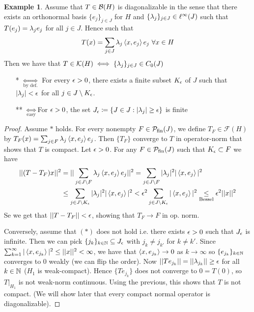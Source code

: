\documentclass[10pt,english,a4paper]{article}
\theoremstyle{definition}
\newtheorem*{example}{Example}
\def\Psfin{\mathcal{P}_{\textnormal{fin}}}
\def\Ff{\mathcal{F}}
\def\Kf{\mathcal{K}}
\begin{document}
\begin{example}
    Assume that $T \in \mathcal{B}(H)$ is diagonalizable in the sense that there exists 
an orthonormal basis $\{e_j\}_{j \in J}$ for $H$ and $\{\lambda_j\}_{j\in J} \in
\ell^{\infty}(J)$ such that $T(e_j) = \lambda_je_j$ for all $j\in J$. Hence such that 
\[ T(x) = \sum_{j \in J} \lambda_{j}\left\langle x, e_j \right\rangle e_j ~\forall x \in H \]
Then we have that $T \in \Kf(H)\iff \{\la_j\}_{j\in J} \in C_{0}(J)$ 
\begin{itemize}
    \item[*] $\underset{\text{by def.}}{\iff}$ For every $\epsilon >0$, there exists
    a finite subset $K_{\epsilon}$ of $J$ such that $|\lambda_j|<\epsilon$ for all $j\in
    J\setminus K_{\epsilon}$.

    \item[**] $\underset{\text{easy}}{\iff}$For $\epsilon >0$, the set $J_{\epsilon}\coloneqq \{ J \in J : |\lambda_j| \geq \epsilon\}$
    is finite
\end{itemize}
\begin{proof}
   Assume $*$ holds. For every nonempty $F \in \Psfin(J)$, we define $T_F \in \Ff(H)$
by $T_{F}(x) = \sum_{j \in F}\lambda_j\left\langle x,e_j \right\rangle e_j$. Then $\{T_F\}$ converge to 
$T$ in operator-norm that shows that $T$ is compact. Let $\epsilon>0$. For any $F \in \Psfin(J)$
such that $K_{\epsilon} \subset F$ we have 
\begin{align*}
||(T-T_F)x||^2 &= ||\sum_{j\in J\setminus F}\lambda_j\left\langle x,e_j \right\rangle e_j||^2 
= \sum_{j\in J\setminus F} |\lambda_j|^2 |\left\langle x,e_j \right\rangle|^2 \\
&\leq \sum_{j\in J\setminus K_{\epsilon}} |\lambda_j|^2 |\left\langle x,e_j \right\rangle|^2 
< \epsilon^2 \sum_{j \in J\setminus K_{\epsilon}}|\left\langle x,e_j \right\rangle|^2 \underset{\text{Bessel}}{\leq}\epsilon^2 ||x||^2
\end{align*}
Se we get that $||T-T_F|| < \epsilon$, showing that $T_F \to F$ in op. norm. 

Conversely, assume that $(*)$ does not hold i.e. there exists $\epsilon>0$ such that 
$J_{\epsilon}$ is infinite. Then we can pick $\{j_k\}_{k\in \mathbb{N}} \subseteq J_{\epsilon}$
with $j_k \neq j_{k'}$ for $k\neq k'$. Since $\sum_{k=1}^{\infty}
|\left\langle x,e_{j_k} \right\rangle|^2 \leq ||x||^2 <\infty$, we have that $\left\langle x,e_{j_k} \right\rangle \to 0$
as $k\to \infty$ so $\{e_{j_k}\}_{k\in \mathbb{N}}$ converges to 0 weakly (we can flip the order). 
Now $||Te_{j_k}|| = ||\lambda_{j_k}|| \geq \epsilon$ for all $k \in \mathbb{N}$ ($H_1$ is weak-compact). Hence $\{Te_{j_k}\}$
does not converge to $0 = T(0)$, so $T\lvert_{H_1}$ is not weak-norm continuous. 
Using the previous, this shows that $T$ is not compact. (We will show later that 
every compact normal operator is diagonalizable).
\end{proof}
\end{example}
\end{document}
